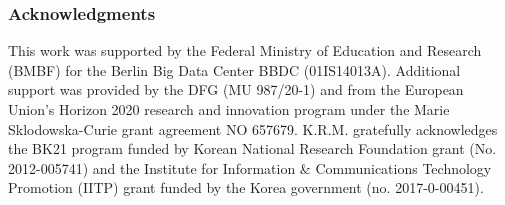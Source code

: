 \documentclass{article}
\begin{document}
\subsubsection*{Acknowledgments}
%
This work was supported by the Federal Ministry of Education and Research (BMBF) for the Berlin Big Data Center BBDC (01IS14013A). Additional support was provided by the DFG (MU 987/20-1) and from the European Union’s Horizon 2020 research and innovation program under the Marie Sklodowska-Curie grant agreement NO 657679. K.R.M. gratefully acknowledges the BK21 program funded by Korean National Research Foundation grant (No. 2012-005741) and the
Institute for Information \& Communications Technology Promotion (IITP) grant funded
by the Korea government (no. 2017-0-00451).




\end{document}
